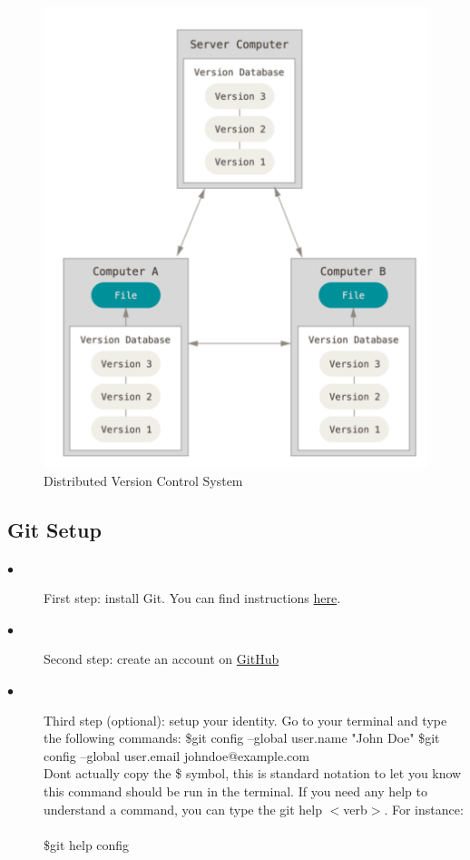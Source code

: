 \documentclass[12pt]{article}
\begin{document}
	\begin{figure}[t]
	\caption{Distributed Version Control System}
	\includegraphics[scale=0.5]{figure1}
	\centering
    \end{figure}

\subsection{Git Setup}
    \begin{description}
    \item[$\bullet$] First step: install Git. You can find instructions \href{https://git-scm.com/book/en/v2/Getting-Started-Installing-Git}{here}. 
    \item[$\bullet$] Second step: create an account on \href{https://github.com}{GitHub}
    \item[$\bullet$] Third step (optional): setup your identity. Go to your terminal and type the following commands:
    \newline
    \newline
    \indent \$git config --global user.name "John Doe"
    \newline
    \newline
    \indent \$git config --global user.email johndoe@example.com \\
    
    Don\textquotesingle t actually copy the \$ symbol, this is standard notation to let you know this command should be run in the terminal. If you need any help to understand a command, you can type the git help $<$verb$>$. For instance: \\
    \\
    \indent \$git help config
    
    \end{description}
\end{document}
